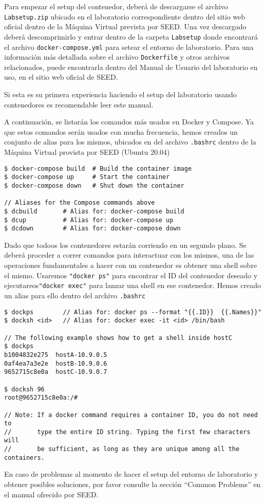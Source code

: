 Para empezar el setup del contenedor, deberá de descargarse el archivo \texttt{Labsetup.zip} ubicado en el laboratorio correspondiente dentro del sitio web oficial dentro de la Máquina Virtual prevista por SEED. Una vez descargado deberá descomprimirlo y entrar dentro de la carpeta \texttt{Labsetup} donde encontrará el archivo \texttt{docker-compose.yml} para setear el entorno de laboratorio. Para una información más detallada sobre el archivo \texttt{Dockerfile} y otros archivos relacionados, puede encontrarla dentro del Manual de Usuario del laboratorio en uso, en el sitio web oficial de SEED.

Si esta es su primera experiencia haciendo el setup del laboratorio usando contenedores es recomendable leer este manual.

A continuación, se listarán los comandos más usados en Docker y Compose.
Ya que estos comandos serán usados con mucha frecuencia, hemos creados un conjunto de alias para los mismos, ubicados en del archivo \texttt{.bashrc} dentro de la Máquina Virtual provista por SEED (Ubuntu 20.04)

\begin{lstlisting}
$ docker-compose build  # Build the container image
$ docker-compose up     # Start the container
$ docker-compose down   # Shut down the container

// Aliases for the Compose commands above
$ dcbuild       # Alias for: docker-compose build
$ dcup          # Alias for: docker-compose up
$ dcdown        # Alias for: docker-compose down
\end{lstlisting}


Dado que todoos los contenedores estarán corriendo en un segundo plano. Se deberá proceder a correr comandos para interactuar con los mismos, una de las operaciones fundamentales a hacer con un contenedor es obtener una shell sobre el mismo. Usaremos \texttt{"docker ps"} para encontrar el ID del contenedor deseado y ejecutareos\texttt{"docker exec"} para lanzar una shell en ese contenedor.
Hemos creado un alias para ello dentro del archivo \texttt{.bashrc}

\begin{lstlisting}
$ dockps        // Alias for: docker ps --format "{{.ID}}  {{.Names}}" 
$ docksh <id>   // Alias for: docker exec -it <id> /bin/bash

// The following example shows how to get a shell inside hostC
$ dockps
b1004832e275  hostA-10.9.0.5
0af4ea7a3e2e  hostB-10.9.0.6
9652715c8e0a  hostC-10.9.0.7

$ docksh 96
root@9652715c8e0a:/#  

// Note: If a docker command requires a container ID, you do not need to 
//       type the entire ID string. Typing the first few characters will 
//       be sufficient, as long as they are unique among all the containers. 
\end{lstlisting}

En caso de problemas al momento de hacer el setup del entorno de laboratorio y obtener posibles soluciones, por favor consulte la sección ``Common Problems'' en el manual ofrecido por SEED. 


